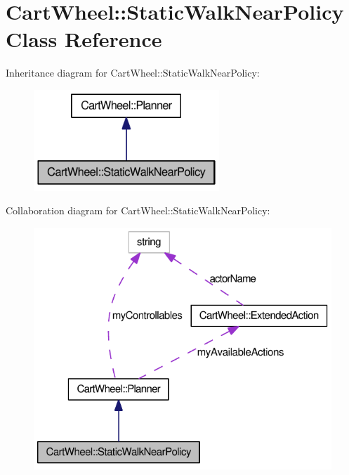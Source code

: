 \hypertarget{classCartWheel_1_1StaticWalkNearPolicy}{
\section{CartWheel::StaticWalkNearPolicy Class Reference}
\label{classCartWheel_1_1StaticWalkNearPolicy}
}


Inheritance diagram for CartWheel::StaticWalkNearPolicy:\nopagebreak
\begin{figure}[H]
\begin{center}
\leavevmode
\includegraphics[width=198pt]{classCartWheel_1_1StaticWalkNearPolicy__inherit__graph}
\end{center}
\end{figure}


Collaboration diagram for CartWheel::StaticWalkNearPolicy:\nopagebreak
\begin{figure}[H]
\begin{center}
\leavevmode
\includegraphics[width=320pt]{classCartWheel_1_1StaticWalkNearPolicy__coll__graph}
\end{center}
\end{figure}
